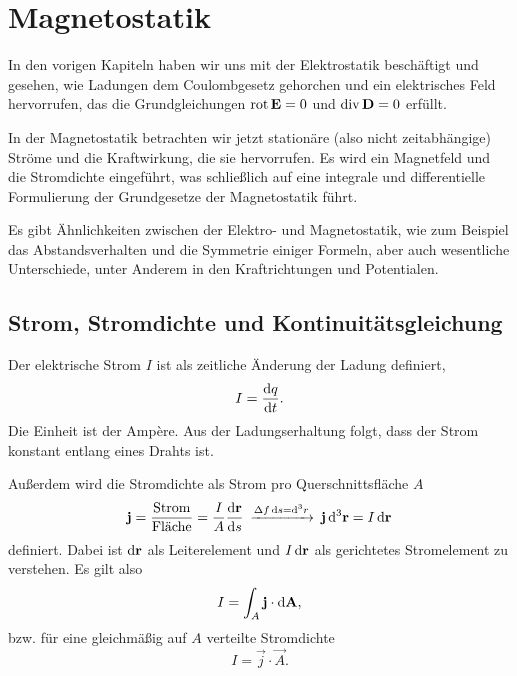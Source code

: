 \chapter{Magnetostatik}


In den vorigen Kapiteln haben wir uns mit der Elektrostatik beschäftigt und gesehen, wie Ladungen dem Coulombgesetz gehorchen und ein elektrisches Feld hervorrufen, das die Grundgleichungen $\operatorname{rot} \mathbf{E}=0$ und $\operatorname{div} \mathbf{D}=0$ erfüllt.

In der Magnetostatik betrachten wir jetzt stationäre (also nicht zeitabhängige) Ströme und die Kraftwirkung, die sie hervorrufen. Es wird ein Magnetfeld und die Stromdichte eingeführt, was schließlich auf eine integrale und differentielle Formulierung der Grundgesetze der Magnetostatik führt.

Es gibt Ähnlichkeiten zwischen der Elektro- und Magnetostatik, wie zum Beispiel das Abstandsverhalten und die Symmetrie einiger Formeln, aber auch wesentliche Unterschiede, unter Anderem in den Kraftrichtungen und Potentialen.

\section{Strom, Stromdichte und Kontinuitätsgleichung}

Der elektrische Strom $I$ ist als zeitliche Änderung der Ladung definiert,
\begin{equation*}
	I=\frac{\mathop{}\!\mathrm{d} q}{\mathop{}\!\mathrm{d} t}.
\end{equation*}
Die Einheit ist der Ampère. Aus der Ladungserhaltung folgt, dass der Strom konstant entlang eines Drahts ist.

Außerdem wird die Stromdichte als Strom pro Querschnittsfläche $A$
\begin{equation*}
	\mathbf{j}=\frac{\text{Strom}}{\text{Fläche}}=\frac{I}{A}\frac{\mathop{}\!\mathrm{d} \mathbf{\mathbf{r}}}{\mathop{}\!\mathrm{d} s}\:\xrightarrow{\Delta  f\mathop{}\!\mathrm{d} s=\mathop{}\!\mathrm{d} ^{3}r}\: \mathbf{j}\mathop{}\!\mathrm{d} ^{3}\mathbf{r}=I\mathop{}\!\mathrm{d} \mathbf{r}
\end{equation*}
definiert. Dabei ist $\mathop{}\!\mathrm{d}\mathbf{r}$ als Leiterelement und $I\mathop{}\!\mathrm{d}\mathbf{r}$ als gerichtetes Stromelement zu verstehen. Es gilt also
\begin{equation*}
	I=\int_A \mathbf{j} \cdot \mathop{}\!\mathrm{d} \mathbf{A},
\end{equation*}
bzw. für eine gleichmäßig auf $A$ verteilte Stromdichte
\begin{equation*}
	I=\vec j\cdot \vec A.
\end{equation*}

